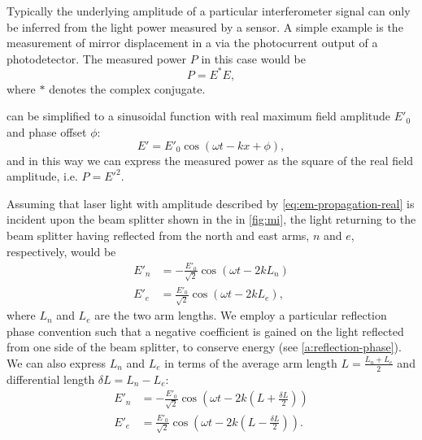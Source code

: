 Typically the underlying amplitude of a particular interferometer signal can only be inferred from the light power measured by a sensor. A simple example is the measurement of mirror displacement in a \MI{} via the photocurrent output of a photodetector. The measured power $P$ in this case would be
\begin{equation}
  P = E^{\ast} E,
\end{equation}
where $\ast$ denotes the complex conjugate.

 can be simplified to a sinusoidal function with real maximum field amplitude $E'_0$ and phase offset $\phi$:
\begin{equation}
  \label{eq:em-propagation-real}
  E' = E'_0 \cos \left( \omega t - kx + \phi \right),
\end{equation}
and in this way we can express the measured power as the square of the real field amplitude, i.e. $P = E'^2$.

Assuming that laser light with amplitude described by \cref{eq:em-propagation-real} is incident upon the beam splitter shown in the \MI{} in \cref{fig:mi}, the light returning to the beam splitter having reflected from the north and east arms, $n$ and $e$, respectively, would be
\begin{align}
  E'_n &= -\frac{E'_0}{\sqrt{2}} \cos \left( \omega t - 2kL_n \right) \\
  E'_e &= \frac{E'_0}{\sqrt{2}} \cos \left( \omega t - 2kL_e \right),
\end{align}
where $L_n$ and $L_e$ are the two arm lengths. We employ a particular reflection phase convention such that a negative coefficient is gained on the light reflected from one side of the beam splitter, to conserve energy (see \cref{a:reflection-phase}). We can also express $L_n$ and $L_e$ in terms of the average arm length $L = \frac{L_n + L_e}{2}$ and differential length $\delta L = L_n - L_e$:
\begin{align}
  E'_n &= -\frac{E'_0}{\sqrt{2}} \cos \left( \omega t - 2k \left( L + \frac{\delta L}{2} \right) \right) \\
  E'_e &= \frac{E'_0}{\sqrt{2}} \cos \left( \omega t - 2k \left( L - \frac{\delta L}{2} \right) \right).
\end{align}

